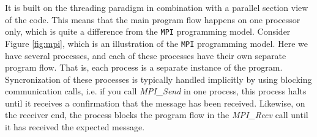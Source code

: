\documentclass[twoside, 11pt, a4paper]{article}
\begin{document}
It is built on the threading paradigm in combination with a parallel section view
of the code. This means that the main program flow happens on one processor only,
which is quite a difference from the \texttt{MPI} programming model. Consider Figure \ref{fig:mpi},
which is an illustration of the \texttt{MPI} programming model. Here we have several
processes, and each of these processes have their own separate program flow. That is, each
process is a separate instance of the program. Syncronization of these processes
is typically handled implicitly by using blocking communication calls, i.e.
if you call \emph{MPI\_Send} in one process, this process halts until
it receives a confirmation that the message has been received. Likewise, on the receiver
end, the process blocks the program flow in the \emph{MPI\_Recv} call until it
has received the expected message.
\end{document}

